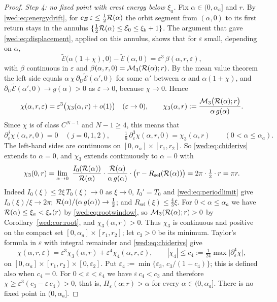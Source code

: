 \begin{proof}
\emph{Step 4: no fixed point with crest energy below $\xi_a$.} Fix $\alpha\in(0,\alpha_a]$ and $r$. By \eqref{wed:eq:energydrift}, for $c_E\,\varepsilon\le\tfrac12\mathcal R(\alpha)$ the orbit segment from $(\alpha,0)$ to its first return stays in the annulus $\{\tfrac12\mathcal R(\alpha)\le\mathcal E_0\le\xi_b+1\}$. The argument that gave \eqref{wed:eq:displacement}, applied on this annulus, shows that for $\varepsilon$ small, depending on $\alpha$,
\[
\tilde{\mathcal E}\bigl(\alpha(1+\chi),0\bigr)-\tilde{\mathcal E}(\alpha,0)=\varepsilon^3\,\beta(\alpha,r,\varepsilon),
\]
with $\beta$ continuous in $\varepsilon$ and $\beta(\alpha,r,0)=\mathcal M_3(\mathcal R(\alpha);r)$. By the mean value theorem the left side equals $\alpha\,\chi\,\partial_U\tilde{\mathcal E}(\alpha',0)$ for some $\alpha'$ between $\alpha$ and $\alpha(1+\chi)$, and $\partial_U\tilde{\mathcal E}(\alpha',0)\to g(\alpha)>0$ as $\varepsilon\to0$, because $\chi\to0$. Hence
\[
\chi(\alpha,r,\varepsilon)=\varepsilon^3\bigl(\chi_3(\alpha,r)+o(1)\bigr)\quad(\varepsilon\to0),\qquad
\chi_3(\alpha,r):=\frac{\mathcal M_3\bigl(\mathcal R(\alpha);r\bigr)}{\alpha\,g(\alpha)} .
\]
Since $\chi$ is of class $C^{N-1}$ and $N-1\ge4$, this means that
\begin{equation}\label{wed:eq:chiderivs}
\partial_\varepsilon^j\chi(\alpha,r,0)=0\quad(j=0,1,2),\qquad \tfrac16\,\partial_\varepsilon^3\chi(\alpha,r,0)=\chi_3(\alpha,r)\qquad(0<\alpha\le\alpha_a).
\end{equation}
The left-hand sides are continuous on $[0,\alpha_a]\times[r_1,r_2]$. So \eqref{wed:eq:chiderivs} extends to $\alpha=0$, and $\chi_3$ extends continuously to $\alpha=0$ with
\[
\chi_3(0,r)=\lim_{\alpha\to0}\ \frac{I_0(\Rem(\alpha))}{\Rem(\alpha)}\cdot\frac{\Rem(\alpha)}{\alpha\,g(\alpha)}\cdot\bigl(r-R_{\mathrm{sel}}(\Rem(\alpha))\bigr)=2\pi\cdot\tfrac12\cdot r=\pi r .
\]
Indeed $I_0(\xi)\le2\xi\,T_0(\xi)\to0$ as $\xi\to0$, $I_0'=T_0$ and \eqref{wed:eq:periodlimit} give $I_0(\xi)/\xi\to2\pi$; $\mathcal R(\alpha)/(\alpha\,g(\alpha))\to\tfrac12$; and $R_{\mathrm{sel}}(\xi)\le\tfrac43\xi$. For $0<\alpha\le\alpha_a$ we have $\mathcal R(\alpha)\le\xi_a<\xi_*(r)$ by \eqref{wed:eq:rootwindow}, so $\mathcal M_3(\mathcal R(\alpha);r)>0$ by Corollary~\ref{wed:cor:root}, and $\chi_3(\alpha,r)>0$. Thus $\chi_3$ is continuous and positive on the compact set $[0,\alpha_a]\times[r_1,r_2]$; let $c_3>0$ be its minimum. Taylor's formula in $\varepsilon$ with integral remainder and \eqref{wed:eq:chiderivs} give
\[
\chi(\alpha,r,\varepsilon)=\varepsilon^3\chi_3(\alpha,r)+\varepsilon^4\chi_4(\alpha,r,\varepsilon),\qquad|\chi_4|\le c_4:=\tfrac1{24}\max\bigl|\partial_\varepsilon^4\chi\bigr|,
\]
on $[0,\alpha_a]\times[r_1,r_2]\times[0,\varepsilon_2]$. Put $\varepsilon_4:=\min\{\varepsilon_3,\,c_3/(1+c_4)\}$; this is defined also when $c_4=0$. For $0<\varepsilon<\varepsilon_4$ we have $\varepsilon\,c_4<c_3$ and therefore $\chi\ge\varepsilon^3(c_3-\varepsilon\,c_4)>0$, that is, $\Pi_\varepsilon(\alpha;r)>\alpha$ for every $\alpha\in(0,\alpha_a]$. There is no fixed point in $(0,\alpha_a]$.


\end{proof}
